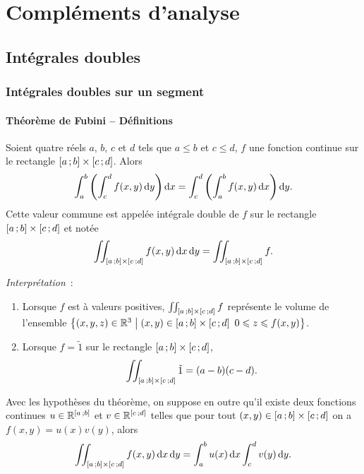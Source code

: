 \chapter{Compléments d'analyse}
\label{chap:complementsanalyse}
\minitoc
\minilof
\minilot

\section{Intégrales doubles}

\subsection{Intégrales doubles sur un segment}

\subsubsection{Théorème de Fubini -- Définitions}

\begin{theo}[Admis]
  Soient quatre réels $a$, $b$, $c$ et $d$ tels que $a\leqslant b$ et $c \leqslant d$, $f$ une fonction continue sur le rectangle $\left[ a \, ;  b \right] \times \left[ c \, ;  d \right]$. Alors
  \begin{equation}
    \int_a^b\left(\int_c^d f(x,y)\mathop{}\mathopen{}\mathrm{d} y \right)\mathop{}\mathopen{}\mathrm{d} x = \int_c^d\left(\int_a^b f(x,y)\mathop{}\mathopen{}\mathrm{d} x\right)\mathop{}\mathopen{}\mathrm{d} y. 
  \end{equation}
Cette valeur commune est appelée intégrale double de $f$ sur le rectangle $\left[ a \, ;  b \right] \times \left[ c \, ;  d \right]$ et notée
\begin{equation}
  \iint_{\left[ a \, ;  b \right] \times \left[ c \, ;  d \right]}f(x,y) \mathop{}\mathopen{}\mathrm{d} x \mathop{}\mathopen{}\mathrm{d} y = \iint_{\left[ a \, ;  b \right] \times \left[ c \, ;  d \right]}f.
\end{equation}
\end{theo}

\emph{Interprétation}~:
\begin{enumerate}
\item Lorsque $f$ est à valeurs positives, $\iint_{\left[ a \, ;  b \right] \times \left[ c \, ;  d \right]}f$ représente le volume de l'ensemble $\left\{(x,y,z)\in\mathbb{R}^3\mathrel{}\middle|\mathrel{}(x,y) \in \left[ a \, ;  b \right] \times \left[ c \, ;  d \right] \ 0 \leqslant z \leqslant f(x,y)\right\}$.
\item Lorsque $f=\tilde{1}$ sur le rectangle $\left[ a \, ;  b \right] \times \left[ c \, ;  d \right]$,
  \begin{equation}
     \iint_{\left[ a \, ;  b \right] \times \left[ c \, ;  d \right]}\tilde{1}=(a-b)(c-d).
  \end{equation}
\end{enumerate}
\begin{corth}
  Avec les hypothèses du théorème, on suppose en outre qu'il existe deux fonctions continues $u \in \mathbb{R}^{\left[ a \, ;  b \right]}$ et $v \in \mathbb{R}^{\left[ c \, ;  d \right]}$ telles que pour tout $(x, y) \in \left[ a \, ;  b \right] \times \left[ c \, ;  d \right]$ on a $f(x,y)=u(x)v(y)$, alors
  \begin{equation}
    \iint_{\left[ a \, ;  b \right] \times \left[ c \, ;  d \right]} f(x,y)\mathop{}\mathopen{}\mathrm{d} x \mathop{}\mathopen{}\mathrm{d} y = \int_a^b u(x)\mathop{}\mathopen{}\mathrm{d} x \int_c^d v(y)\mathop{}\mathopen{}\mathrm{d} y.
  \end{equation}
\end{corth}

